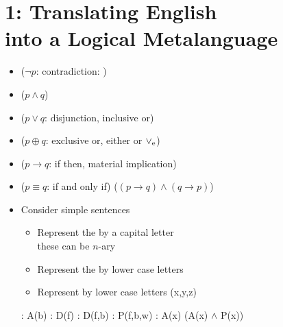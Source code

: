 \documentclass[headrule,footrule]{foils}
\begin{document}
\section{1: Translating English \\ into a Logical Metalanguage}

\begin{itemize}
\item {} ($\neg p$: contradiction: )
\item {} ($p \wedge q$)
\item {}  ($p \vee q$: disjunction, inclusive or)
\item {} ($p \oplus q$: exclusive or, either or 
  $\vee_\textnormal{\scriptsize e}$)
\item {} ($p \rightarrow q$: if then, material implication)
\item {} ($p \equiv q$: if and only if) 
  ($(p \rightarrow q) \wedge (q \rightarrow p)$)
\end{itemize}


\begin{itemize}
\item Consider simple sentences
  \begin{itemize}
  \item Represent the  by a capital letter
    \\ these can be $n$-ary
  \item Represent the  by lower case letters
  \item Represent  by lower case letters (x,y,z)
  \end{itemize}
  \begin{exe}
    \ex {}: A(b)
    \ex {}: D(f)
    \ex {}: D(f,b)
    \ex {}: P(f,b,w)
    \ex {}: A(x) \hfill (A(x) $\wedge$ P(x)) 
  \end{exe}
\end{itemize}
\end{document}
